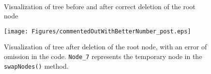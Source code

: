    \begin{figure}[H]
    \centering
    \mbox{
        \label{fig:tree_correct_pre}
        \label{fig:tree_correct_mainBody}
        }
    \caption[Visualization of tree]{Visualization of tree before and after correct deletion of the root node}
    \label{fig:tree_beforeAndAfter}
    \end{figure}

    \begin{singlespacing}
    \begin{figure}[H]
    \centering
    \texttt{[image: Figures/commentedOutWithBetterNumber\_post.eps]}
    \caption[Visualization of tree after deletion of root (error or omission)]{Visualization of tree
    after deletion of the root node, with an error of omission in the code.
    \texttt{Node\_7} represents the temporary node in the \texttt{swapNodes()} method.}
    \label{fig:tree_commentedOut_mainBody}
    \end{figure}
    \end{singlespacing}
